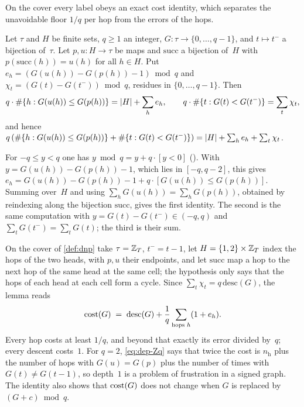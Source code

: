 On the cover every label obeys an exact cost identity, which separates the unavoidable floor $1/q$ per hop from the
errors of the hops.

\begin{lemma}\label{lem:Zq}
Let $\tau$ and $H$ be finite sets, $q\ge1$ an integer, $G\colon\tau\to\{0,\dots,q-1\}$, and $t\mapsto t^-$ a bijection
of~$\tau$. Let $p,u\colon H\to\tau$ be maps and $\mathrm{succ}$ a bijection of~$H$ with
$p(\mathrm{succ}(h))=u(h)$ for all $h\in H$. Put $e_h=(G(u(h))-G(p(h))-1)\bmod q$ and $\chi_t=(G(t)-G(t^-))\bmod q$,
residues in $\{0,\dots,q-1\}$. Then
\[
  q\cdot\#\{h:G(u(h))\le G(p(h))\}=\lvert H \rvert+\sum_he_h,\qquad q\cdot\#\{t:G(t)<G(t^-)\}=\sum_t\chi_t,
\]
and hence $q\,(\#\{h:G(u(h))\le G(p(h))\}+\#\{t:G(t)<G(t^-)\})=\lvert H \rvert+\sum_he_h+\sum_t\chi_t$.
\end{lemma}

\begin{outline}
For $-q\le y<q$ one has $y\bmod q=y+q\cdot[y<0]$ (). With $y=G(u(h))-G(p(h))-1$, which lies in
$[-q,q-2]$, this gives $e_h=G(u(h))-G(p(h))-1+q\cdot[G(u(h))\le G(p(h))]$. Summing over~$H$ and using
$\sum_hG(u(h))=\sum_hG(p(h))$, obtained by reindexing along the bijection $\mathrm{succ}$, gives the first identity. The
second is the same computation with $y=G(t)-G(t^-)\in(-q,q)$ and $\sum_tG(t^-)=\sum_tG(t)$; the third is their sum.
\end{outline}

On the cover of \cref{def:dnp} take $\tau=\mathbb{Z}_T$, $t^-=t-1$, let $H=\{1,2\}\times\mathbb{Z}_T$ index the hops of the two heads, with
$p,u$ their endpoints, and let $\mathrm{succ}$ map a hop to the next hop of the same head at the same cell; the hypothesis only
says that the hops of each head at each cell form a cycle. Since $\sum_t\chi_t=q\,\mathrm{desc}(G)$, the lemma reads
\begin{equation}\label{eq:dep-Zq}
  \mathrm{cost}(G)\;=\;\mathrm{desc}(G)+\frac1q\sum_{\text{hops }h}(1+e_h).
\end{equation}
Every hop costs at least $1/q$, and beyond that exactly its error divided by~$q$; every descent costs~$1$. For $q=2$,
\eqref{eq:dep-Zq} says that twice the cost is $n_{\mathrm h}$ plus the number of hops with $G(u)=G(p)$ plus the number
of times with $G(t)\ne G(t-1)$, so depth~$1$ is a problem of frustration in a signed graph. The identity also shows
that $\mathrm{cost}(G)$ does not change when $G$ is replaced by $(G+c)\bmod q$.

